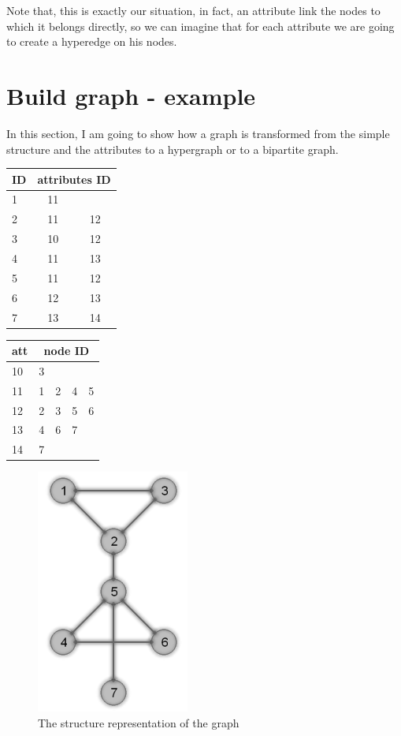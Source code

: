 Note that, this is exactly our situation, in fact, an attribute link the nodes to which it belongs directly, so we can imagine that for each attribute we are going to create a hyperedge on his nodes.
%
%

\section{Build graph - example}
In this section, I am going to show how a graph is transformed from the simple structure and the attributes to a hypergraph or to a bipartite graph.\\
%
\begin{multicols}{2}
	\begin{center}
		\begin{tabular}{|l|cc|}
		\hline
		ID&\multicolumn{2}{c|}{attributes ID}\\
		\hline
		1&11&\\
		2&11&12\\
		3&10&12\\
		4&11&13\\
		5&11&12\\
		6&12&13\\
		7&13&14\\
		\hline
		\end{tabular}
		\label{tab:7_ID_to_att}
		\begin{tabular}{|l|cccc|}
		\hline
		att&\multicolumn{4}{c|}{node ID}\\
		\hline
		10&3&&&\\
		11&1&2&4&5\\
		12&2&3&5&6\\
		13&4&6&7&\\
		14&7&&&\\
		\hline
		\end{tabular}
		\label{tab:7_att_to_ID}
	\end{center}
\end{multicols}
%
%
\begin{figure}[htp]
	\centering
	\includegraphics{images/7transform_str}
	\caption{The structure representation of the graph}
	\label{fig:7transform_str}
\end{figure}
